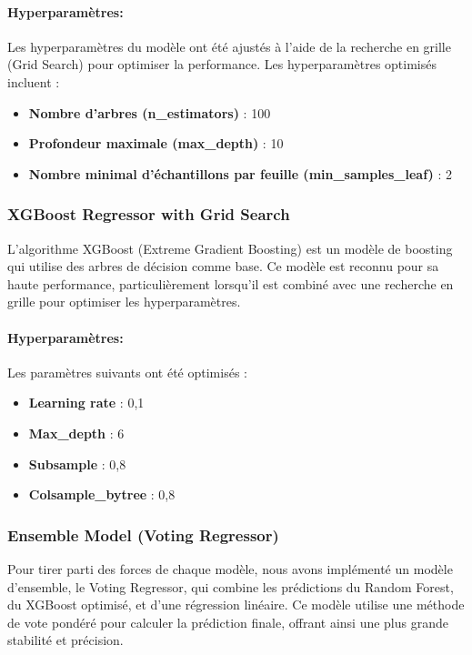 \paragraph*{Hyperparamètres:}
Les hyperparamètres du modèle ont été ajustés à l'aide de la recherche en grille (Grid Search) pour optimiser la performance. Les hyperparamètres optimisés incluent :
\begin{itemize}
	\item \textbf{Nombre d'arbres (n\_estimators)} : 100
	\item \textbf{Profondeur maximale (max\_depth)} : 10
	\item \textbf{Nombre minimal d'échantillons par feuille (min\_samples\_leaf)} : 2
\end{itemize}

\subsubsection{XGBoost Regressor with Grid Search}

L'algorithme XGBoost (Extreme Gradient Boosting) est un modèle de boosting qui utilise des arbres de décision comme base. Ce modèle est reconnu pour sa haute performance, particulièrement lorsqu'il est combiné avec une recherche en grille pour optimiser les hyperparamètres.

\paragraph*{Hyperparamètres:}
Les paramètres suivants ont été optimisés :
\begin{itemize}
	\item \textbf{Learning rate} : 0,1
	\item \textbf{Max\_depth} : 6
	\item \textbf{Subsample} : 0,8
	\item \textbf{Colsample\_bytree} : 0,8
\end{itemize}

\subsubsection{Ensemble Model (Voting Regressor)}

Pour tirer parti des forces de chaque modèle, nous avons implémenté un modèle d'ensemble, le Voting Regressor, qui combine les prédictions du Random Forest, du XGBoost optimisé, et d'une régression linéaire. Ce modèle utilise une méthode de vote pondéré pour calculer la prédiction finale, offrant ainsi une plus grande stabilité et précision.
